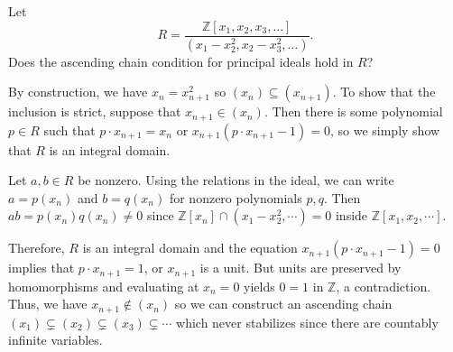 \documentclass[../../master.tex]{subfiles}
\begin{document}
    \begin{problem}
        Let
        \[
            R = \frac{\mathbb{Z}[x_1, x_2, x_3, \ldots]}{(x_1-x_2^{2},
            x_2-x_3^{2}, \ldots)}.
        \] 
        Does the ascending chain condition for principal ideals hold in $R$?
    \end{problem}

    \begin{solution}
        By construction, we have $x_n = x_{n+1}^2$ so $(x_n) \subseteq
        (x_{n+1})$. To show that the inclusion is strict, suppose that $x_{n+1}
        \in (x_{n})$. Then there is some polynomial $p \in R$ such that $p \cdot
        x_{n+1} = x_n$ or $x_{n+1} (p \cdot x_{n+1} - 1) = 0$, so we simply show
        that $R$ is an integral domain.

        Let $a, b \in R$ be nonzero. Using the relations in the ideal, we can
        write $a = p(x_{n})$ and $b = q(x_n)$ for nonzero polynomials $p, q$.
        Then $ab = p(x_n) q(x_n) \neq 0$ since $\mathbb{Z}[x_{n}] \cap (x_1 -
        x_2^2, \cdots) = 0$ inside $\mathbb{Z}[x_1, x_2, \cdots]$.

        Therefore, $R$ is an integral domain and the equation $x_{n+1} (p \cdot
        x_{n+1} - 1) = 0$ implies that  $p \cdot x_{n+1} = 1$, or $x_{n+1}$ is a
        unit. But units are preserved by homomorphisms and evaluating at $x_{n}
        = 0$ yields $0 = 1$ in $\mathbb{Z}$, a contradiction. Thus, we have
        $x_{n+1} \notin (x_{n})$ so we can construct an ascending chain $(x_1)
        \subsetneq (x_2) \subsetneq (x_3) \subsetneq \cdots$ which never
        stabilizes since there are countably infinite variables.
    \end{solution}
\end{document}
